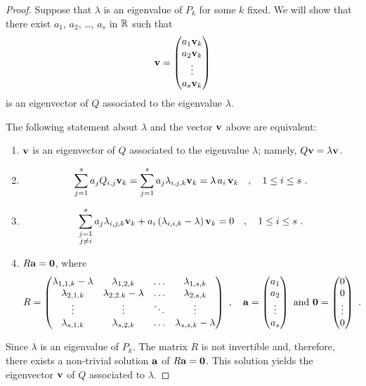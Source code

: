 \begin{proof}
Suppose that $\lambda$ is an eigenvalue of $P_k$ for some $k$ fixed.  We
will show that there exist $a_1$, $a_2$, \ldots, $a_s$ in $\mathbb{R}$ such
that
\[
\mathbf{v} =
\begin{pmatrix}
a_1 \mathbf{v}_k \\ a_2 \mathbf{v}_k \\ \vdots \\ a_s \mathbf{v}_k
\end{pmatrix}
\]
is an eigenvector of $Q$ associated to the eigenvalue $\lambda$.

The following statement about $\lambda$ and the vector $\mathbf{v}$ above
are equivalent:
{
\renewcommand{\labelenumi}{\roman{enumi}.}
\begin{enumerate}
\item $\mathbf{v}$ is an eigenvector of $Q$ associated to the
  eigenvalue $\lambda$; namely, $Q\mathbf{v} = \lambda \mathbf{v}$.
\item
\[
\sum_{j=1}^s a_j Q_{i,j}\mathbf{v}_k =
\sum_{j=1}^s a_j \lambda_{i,j,k}\mathbf{v}_k = \lambda\, a_i\, \mathbf{v}_k \quad ,
\quad 1 \leq i \leq s \ .
\]
\item
\[
\sum_{\substack{j=1\\j\neq i}}^s a_j \lambda_{i,j,k}\mathbf{v}_k +
a_i \left(\lambda_{i,i,k} - \lambda \right) \mathbf{v}_k = 0 \quad ,
\quad 1 \leq i \leq s \ .
\]
\item $R \mathbf{a} = \mathbf{0}$, where
\[
R =
\begin{pmatrix}
\lambda_{1,1,k} -\lambda & \lambda_{1,2,k} & \ldots & \lambda_{1,s,k} \\
\lambda_{2,1,k} & \lambda_{2,2.k}-\lambda & \ldots & \lambda_{2,s,k} \\
\vdots & \vdots & \ddots & \vdots \\
\lambda_{s,1,k} & \lambda_{s,2,k} & \ldots & \lambda_{s,s,k}-\lambda \\
\end{pmatrix} \ , \quad
\VEC{a} =
\begin{pmatrix}
a_1 \\ a_2 \\ \vdots \\ a_s
\end{pmatrix}
\ \text{and} \ 
\VEC{0} =
\begin{pmatrix}
0 \\0 \\ \vdots \\ 0
\end{pmatrix} \ .
\]
\end{enumerate}
}
Since $\lambda$ is an eigenvalue of $P_k$.  The matrix $R$ is not
invertible and, therefore, there exists a non-trivial solution $\mathbf{a}$
of $R \mathbf{a} = \mathbf{0}$.  This solution yields the eigenvector
$\mathbf{v}$ of $Q$ associated to $\lambda$.
\end{proof}


